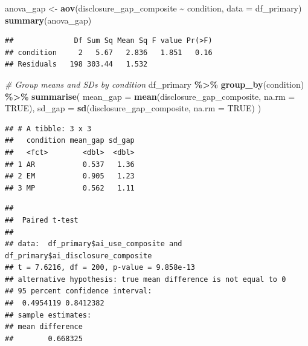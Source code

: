 \documentclass[
]{article}
\newenvironment{Shaded}{\begin{snugshade}}{\end{snugshade}}
\newcommand{\AttributeTok}[1]{\textcolor[rgb]{0.13,0.29,0.53}{#1}}
\newcommand{\CommentTok}[1]{\textcolor[rgb]{0.56,0.35,0.01}{\textit{#1}}}
\newcommand{\ConstantTok}[1]{\textcolor[rgb]{0.56,0.35,0.01}{#1}}
\newcommand{\FunctionTok}[1]{\textcolor[rgb]{0.13,0.29,0.53}{\textbf{#1}}}
\newcommand{\NormalTok}[1]{#1}
\newcommand{\OtherTok}[1]{\textcolor[rgb]{0.56,0.35,0.01}{#1}}
\newcommand{\SpecialCharTok}[1]{\textcolor[rgb]{0.81,0.36,0.00}{\textbf{#1}}}
\begin{document}
\begin{Shaded}
\begin{Highlighting}[]
\NormalTok{anova\_gap }\OtherTok{\textless{}{-}} \FunctionTok{aov}\NormalTok{(disclosure\_gap\_composite }\SpecialCharTok{\textasciitilde{}}\NormalTok{ condition, }\AttributeTok{data =}\NormalTok{ df\_primary)}
\FunctionTok{summary}\NormalTok{(anova\_gap)}
\end{Highlighting}
\end{Shaded}

\begin{verbatim}
##              Df Sum Sq Mean Sq F value Pr(>F)
## condition     2   5.67   2.836   1.851   0.16
## Residuals   198 303.44   1.532
\end{verbatim}

\begin{Shaded}
\begin{Highlighting}[]
\CommentTok{\# Group means and SDs by condition}
\NormalTok{df\_primary }\SpecialCharTok{\%\textgreater{}\%}
  \FunctionTok{group\_by}\NormalTok{(condition) }\SpecialCharTok{\%\textgreater{}\%}
  \FunctionTok{summarise}\NormalTok{(}
    \AttributeTok{mean\_gap =} \FunctionTok{mean}\NormalTok{(disclosure\_gap\_composite, }\AttributeTok{na.rm =} \ConstantTok{TRUE}\NormalTok{),}
    \AttributeTok{sd\_gap   =} \FunctionTok{sd}\NormalTok{(disclosure\_gap\_composite, }\AttributeTok{na.rm =} \ConstantTok{TRUE}\NormalTok{)}
\NormalTok{  )}
\end{Highlighting}
\end{Shaded}

\begin{verbatim}
## # A tibble: 3 x 3
##   condition mean_gap sd_gap
##   <fct>        <dbl>  <dbl>
## 1 AR           0.537   1.36
## 2 EM           0.905   1.23
## 3 MP           0.562   1.11
\end{verbatim}

\begin{Shaded}
\end{Shaded}

\begin{verbatim}
## 
##  Paired t-test
## 
## data:  df_primary$ai_use_composite and df_primary$ai_disclosure_composite
## t = 7.6216, df = 200, p-value = 9.858e-13
## alternative hypothesis: true mean difference is not equal to 0
## 95 percent confidence interval:
##  0.4954119 0.8412382
## sample estimates:
## mean difference 
##        0.668325
\end{verbatim}
\end{document}

